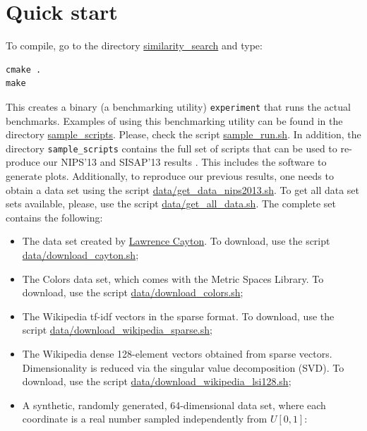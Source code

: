 \documentclass[runningheads,a4paper]{llncs}
\newcommand{\ttt}[1]{\texttt{#1}}
\begin{document}
{\section{Quick start}
To compile, go to the directory \href{https://github.com/searchivarius/NonMetricSpaceLib/tree/master/similarity_search}{similarity\_search} and type:  
\begin{verbatim}
cmake .  
make   
\end{verbatim}
This creates a binary (a benchmarking utility) \ttt{experiment} that runs the actual benchmarks. 
Examples of using this benchmarking utility can be found in the directory \href{https://github.com/searchivarius/NonMetricSpaceLib/tree/master/sample_scripts}{sample\_scripts}. 
Please, check the script \href{https://github.com/searchivarius/NonMetricSpaceLib/tree/master/sample_scripts/sample_run.sh}{sample\_run.sh}. 
In addition, the directory \ttt{sample\_scripts} contains the full set of scripts that can be used to re-produce our NIPS'13 and SISAP'13 results \cite{Boytsov_and_Bilegsaikhan:sisap2013,Boytsov_and_Bilegsaikhan:nips2013}.
This includes the software to generate plots. 
Additionally, to reproduce our previous results, one needs to obtain a data set using the script 
\href{https://github.com/searchivarius/NonMetricSpaceLib/tree/master/data/get_data_nips2013.sh}{data/get\_data\_nips2013.sh}. 
To get all data set sets available, please, use the script
\href{https://github.com/searchivarius/NonMetricSpaceLib/tree/master/data/get_all_data.sh}{data/get\_all\_data.sh}. 
The complete set contains the following:

\begin{itemize} 
\item The data set created by \href{http://lcayton.com}{Lawrence Cayton}. 
To download, use the script 
\href{https://github.com/searchivarius/NonMetricSpaceLib/tree/master/data/download_cayton.sh}{data/download\_cayton.sh};
\item The Colors data set, which comes with the Metric Spaces Library\cite{LibMetricSpace}.
To download, use the script 
\href{https://github.com/searchivarius/NonMetricSpaceLib/tree/master/data/download_colors.sh}{data/download\_colors.sh};
\item The Wikipedia tf-idf vectors in the sparse format.
To download, use the script 
\href{https://github.com/searchivarius/NonMetricSpaceLib/tree/master/data/download_wikipedia_sparse.sh}{data/download\_wikipedia\_sparse.sh};
\item The Wikipedia dense 128-element vectors obtained from sparse vectors.
Dimensionality is reduced via the singular value decomposition (SVD).
To download, use the script 
\href{https://github.com/searchivarius/NonMetricSpaceLib/tree/master/data/download_wikipedia_lsi128.sh}{data/download\_wikipedia\_lsi128.sh};
\item A synthetic, randomly generated, 64-dimensional data set, where each coordinate is a real number sampled independently from $U[0,1]$:  


\end{itemize}}
\end{document}
